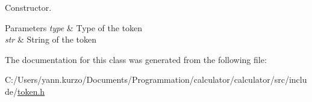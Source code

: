 Constructor. 


\begin{DoxyParams}{Parameters}
{\em type} & Type of the token \\
\hline
{\em str} & String of the token \\
\hline
\end{DoxyParams}


The documentation for this class was generated from the following file\+:\begin{DoxyCompactItemize}
\item 
C\+:/\+Users/yann.\+kurzo/\+Documents/\+Programmation/calculator/calculator/src/include/\hyperlink{token_8h}{token.\+h}\end{DoxyCompactItemize}
